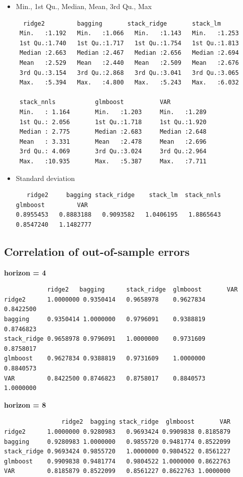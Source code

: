 \begin{itemize}

\item Min., 1st Qu., Median, Mean, 3rd Qu., Max

\begin{verbatim}
  ridge2         bagging       stack_ridge       stack_lm               
 Min.   :1.192   Min.   :1.066   Min.   :1.143   Min.   :1.253      
 1st Qu.:1.740   1st Qu.:1.717   1st Qu.:1.754   1st Qu.:1.813      
 Median :2.663   Median :2.467   Median :2.656   Median :2.694      
 Mean   :2.529   Mean   :2.440   Mean   :2.509   Mean   :2.676      
 3rd Qu.:3.154   3rd Qu.:2.868   3rd Qu.:3.041   3rd Qu.:3.065      
 Max.   :5.394   Max.   :4.800   Max.   :5.243   Max.   :6.032      
 
 stack_nnls           glmboost          VAR
 Min.   : 1.164       Min.   :1.203     Min.   :1.289
 1st Qu.: 2.056       1st Qu.:1.718     1st Qu.:1.920
 Median : 2.775       Median :2.683     Median :2.648 
 Mean   : 3.331       Mean   :2.478     Mean   :2.696 
 3rd Qu.: 4.069       3rd Qu.:3.024     3rd Qu.:2.964
 Max.   :10.935       Max.   :5.387     Max.   :7.711
\end{verbatim}

\item Standard deviation

\begin{verbatim}
   ridge2     bagging stack_ridge    stack_lm  stack_nnls    glmboost         VAR
0.8955453   0.8883188   0.9093582   1.0406195   1.8865643   0.8547240   1.1482777 
\end{verbatim}

\end{itemize}

\subsection{Correlation of out-of-sample errors}
\label{oos_errors_cor}

\textbf{horizon = 4}

\begin{verbatim}
            ridge2   bagging      stack_ridge  glmboost       VAR
ridge2      1.0000000 0.9350414   0.9658978    0.9627834      0.8422500
bagging     0.9350414 1.0000000   0.9796091    0.9388819      0.8746823
stack_ridge 0.9658978 0.9796091   1.0000000    0.9731609      0.8758017
glmboost    0.9627834 0.9388819   0.9731609    1.0000000      0.8840573
VAR         0.8422500 0.8746823   0.8758017    0.8840573      1.0000000
\end{verbatim}

\textbf{horizon = 8}

\begin{verbatim}
                ridge2  bagging stack_ridge  glmboost       VAR
ridge2      1.0000000 0.9280983   0.9693424 0.9909838 0.8185879
bagging     0.9280983 1.0000000   0.9855720 0.9481774 0.8522099
stack_ridge 0.9693424 0.9855720   1.0000000 0.9804522 0.8561227
glmboost    0.9909838 0.9481774   0.9804522 1.0000000 0.8622763
VAR         0.8185879 0.8522099   0.8561227 0.8622763 1.0000000
\end{verbatim}
